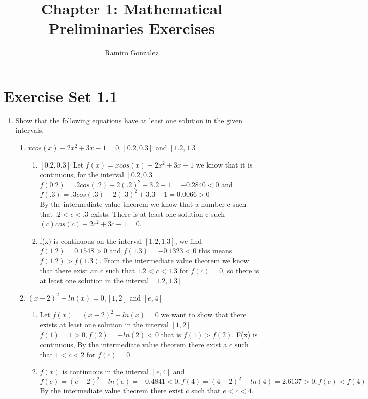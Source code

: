 \documentclass{article}
\title{Chapter 1: Mathematical Preliminaries Exercises}
\author{Ramiro Gonzalez }
\date{}
\begin{document}
\maketitle
\section{Exercise Set 1.1}
\begin{enumerate}
    \item Show that the following equations have at least one solution in the given intervals.
    \begin{enumerate}
        \item $xcos(x)-2x^2+3x-1 = 0, [0.2,0.3]$ and $[1.2,1.3]$\\
        \begin{enumerate}
            \item $[0.2,0.3]$ Let $f(x) = xcos(x) - 2x^2 + 3x - 1$ we know that it is continuous, for the interval $[0.2,0.3]$ \\
                $f(0.2) = .2cos(.2)-2(.2)^2+3.2-1 = -0.2840 < 0 $ and $f(.3) = .3cos(.3)-2(.3)^2+3.3-1 = 0.0066 > 0  $\\
                By the intermediate value theorem we know that a number c such that $.2 < c < .3$ exists. There is at least one solution c such $(c)cos(c)-2c^2 + 3c - 1 = 0$. 
            \item  f(x) is continuous on the interval $[1.2,1.3]$, we find $f(1.2) = 0.1548 > 0 $ and $f(1.3) = -0.1323 < 0 $ this means $f(1.2) > f(1.3)$. From the intermediate value theorem we know that there exist an c such that $1.2 < c < 1.3$ for $f(c) = 0$, so there is at least one solution in the interval $[1.2,1.3]$
        \end{enumerate}
        \item $(x-2)^2-ln(x)=0, [1,2]$ and $[e,4]$
        \begin{enumerate}
            \item Let $f(x) = (x-2)^2-ln(x) = 0$ we want to show that there exists at least one solution in the interval $[1,2]$. $f(1) = 1 > 0, f(2) = -ln(2) <0$ that is $f(1) > f(2)$. F(x) is continuous, By the intermediate value theorem there exist a c such that $1 < c < 2$ for $f(c) = 0$.
            \item $f(x)$ is continuous in the interval $[e,4]$ and $f(e) = (e-2)^2-ln(e) = -0.4841 < 0, f(4) = (4-2)^2-ln(4) = 2.6137 > 0, f(e) < f(4)$ By the intermediate value theorem there exist c such that $e < c < 4$.
        \end{enumerate}

\end{enumerate}
\end{enumerate}
\end{document}
